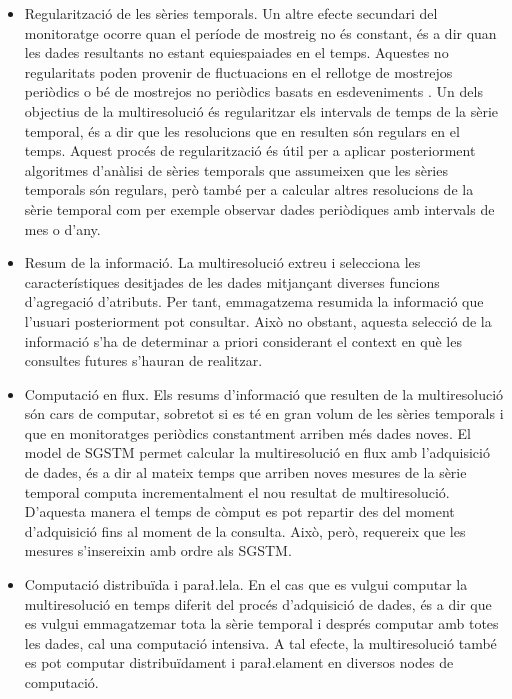 \begin{itemize}
\item Regularització de les sèries temporals. Un altre efecte
  secundari del monitoratge ocorre quan el període de mostreig no és
  constant, és a dir quan les dades resultants no estant equiespaiades
  en el temps. Aquestes no regularitats poden provenir de fluctuacions
  en el rellotge de mostrejos periòdics o bé de mostrejos no periòdics
  basats en esdeveniments \parencite{kopetz11:realtime}. Un dels
  objectius de la multiresolució és regularitzar els intervals de
  temps de la sèrie temporal, és a dir que les resolucions que en
  resulten són regulars en el temps. Aquest procés de regularització
  és útil per a aplicar posteriorment algoritmes d'anàlisi de sèries
  temporals que assumeixen que les sèries temporals són regulars, però
  també per a calcular altres resolucions de la sèrie temporal com per
  exemple observar dades periòdiques amb intervals de mes o d'any.


\item Resum de la informació.  La multiresolució extreu i selecciona
  les característiques desitjades de les dades mitjançant diverses
  funcions d'agregació d'atributs. Per tant, emmagatzema resumida la
  informació que l'usuari posteriorment pot consultar. Això no
  obstant, aquesta selecció de la informació s'ha de determinar a
  priori considerant el context en què les consultes futures s'hauran
  de realitzar.


\item Computació en flux. Els resums d'informació que resulten de la
  multiresolució són cars de computar, sobretot si es té en gran volum
  de les sèries temporals i que en monitoratges periòdics constantment
  arriben més dades noves. El model de \gls{SGSTM} permet calcular la
  multiresolució en flux amb l'adquisició de dades, és a dir al mateix
  temps que arriben noves mesures de la sèrie temporal computa
  incrementalment el nou resultat de multiresolució. D'aquesta manera
  el temps de còmput es pot repartir des del moment d'adquisició fins
  al moment de la consulta. Això, però, requereix que les mesures
  s'insereixin amb ordre als \gls{SGSTM}.

\item Computació distribuïda i para\l.lela. En el cas que es vulgui
  computar la multiresolució en temps diferit del procés d'adquisició
  de dades, és a dir que es vulgui emmagatzemar tota la sèrie temporal
  i després computar amb totes les dades, cal una computació
  intensiva. A tal efecte, la multiresolució també es pot computar
  distribuïdament i para\l.elament en diversos nodes de computació.

 
\end{itemize}


